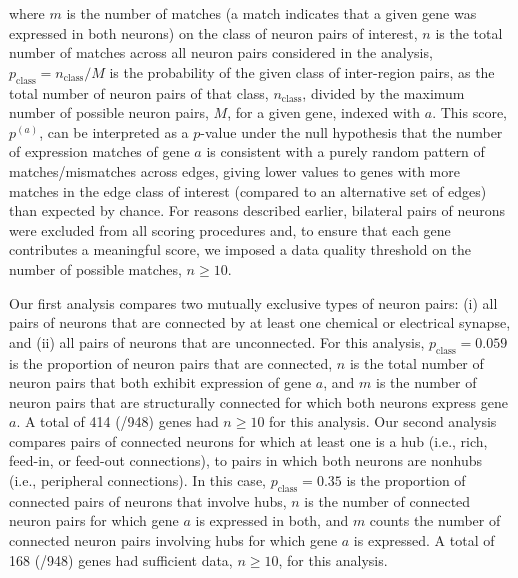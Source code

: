 \documentclass[10pt,letterpaper]{article}
\begin{document}
where $m$ is the number of matches (a match indicates that a given gene was expressed in both neurons) on the class of neuron pairs of interest, $n$ is the total number of matches across all neuron pairs considered in the analysis, $p_\mathrm{class} = n_\mathrm{class}/M$ is the probability of the given class of inter-region pairs, as the total number of neuron pairs of that class, $n_\mathrm{class}$, divided by the maximum number of possible neuron pairs, $M$, for a given gene, indexed with $a$.
This score, $p^{(a)}$, can be interpreted as a $p$-value under the null hypothesis that the number of expression matches of gene $a$ is consistent with a purely random pattern of matches/mismatches across edges, giving lower values to genes with more matches in the edge class of interest (compared to an alternative set of edges) than expected by chance.
For reasons described earlier, bilateral pairs of neurons were excluded from all scoring procedures and, to ensure that each gene contributes a meaningful score, we imposed a data quality threshold on the number of possible matches, $n \geq 10$.

Our first analysis compares two mutually exclusive types of neuron pairs:
(i) all pairs of neurons that are connected by at least one chemical or electrical synapse, and
(ii) all pairs of neurons that are unconnected.
For this analysis, $p_\mathrm{class} = 0.059$ is the proportion of neuron pairs that are connected, $n$ is the total number of neuron pairs that both exhibit expression of gene $a$, and $m$ is the number of neuron pairs that are structurally connected for which both neurons express gene $a$.
A total of 414 (/948) genes had $n \geq 10$ for this analysis.
Our second analysis compares pairs of connected neurons for which at least one is a hub (i.e., rich, feed-in, or feed-out connections), to pairs in which both neurons are nonhubs (i.e., peripheral connections).
In this case, $p_\mathrm{class} = 0.35$ is the proportion of connected pairs of neurons that involve hubs, $n$ is the number of connected neuron pairs for which gene $a$ is expressed in both, and $m$ counts the number of connected neuron pairs involving hubs for which gene $a$ is expressed.
A total of 168 (/948) genes had sufficient data, $n \geq 10$, for this analysis.
\end{document}
